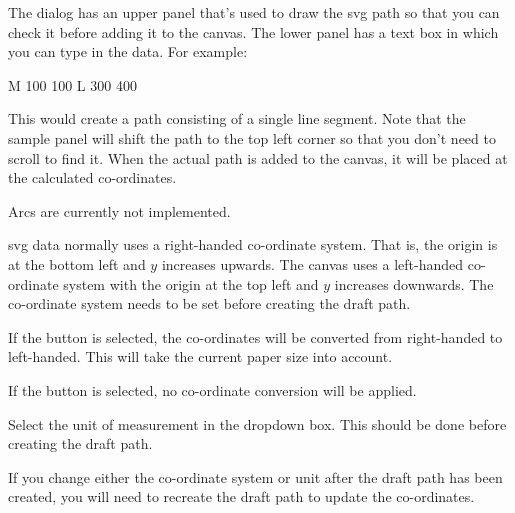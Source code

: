 
The  dialog has an upper panel that's used to draw
the \gls{svg} path so that you can check it before adding it to the
\gls{canvas}. The lower panel has a text box in which you can type
in the data. For example: 
\begin{compactcodebox}
M 100 100 L 300 400
\end{compactcodebox}
This would create a path consisting of a single line segment.
Note that the sample panel will shift the path to the top left
corner so that you don't need to scroll to find it. When the actual path
is added to the \gls{canvas}, it will be placed at the calculated
co-ordinates.

\begin{warning}
Arcs are currently not implemented.
\end{warning}


\gls{svg} data normally uses a right-handed \gls{co-ordinate} system.
That is, the origin is at the bottom left and $y$ increases upwards.
The \gls{canvas} uses a left-handed \gls{co-ordinate} system
with the origin at the top left and $y$ increases downwards.
The \gls{co-ordinate} system needs to be set before creating the
draft path.


If the  button is selected,
the \glspl{co-ordinate} will be converted from right-handed to
left-handed. This will take the current paper size into account.


If the  button is selected,
no \gls{co-ordinate} conversion will be applied.


Select the unit of measurement in the  
\gls{dropdown} box. This should be done before creating the draft
path.

\begin{important}
If you change either the \gls{co-ordinate} system
or unit after the draft path has been created, you will need to recreate the
draft path to update the \glspl{co-ordinate}.
\end{important}


